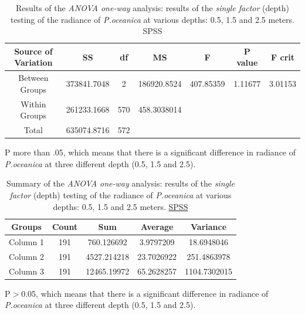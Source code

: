 \documentclass[11pt]{article}
\begin{document}
\begin{appendices}
\begin{table}[htbp]
	\caption{Results of the \textit{ANOVA one-way} analysis: results of the \textit{single factor} (depth) testing of the radiance of \textit{P.oceanica} at various depths: 0.5, 1.5 and 2.5 meters. \ac{SPSS}}\label{tab:8}
	\begin{center}
	\begin{tabular}{|c|c|c|c|c|c|c|}
		\hline\hline
		\textbf{Source of Variation} & \textbf{SS} & \textbf{df} & \textbf{MS} & \textbf{F} & \textbf{P value} & \textbf{F crit} \\ \hline
		Between Groups & 373841.7048 & 2 & 186920.8524 & 407.85359 & 1.11677 & 3.01153 \\ \hline
		Within Groups & 261233.1668 & 570 & 458.3038014 & & & \\ \hline
		Total &  635074.8716 & 572 & & & & \\ \hline
	\end{tabular}
	\end{center} 
	P more than .05, which means that there is a significant difference in radiance of \textit{P.oceanica} at three different depth (0.5, 1.5 and 2.5). 
	
\end{table}

\begin{table}[htbp]
	\caption{Summary of the \textit{ANOVA one-way} analysis: results of the \textit{single factor} (depth) testing of the radiance of \textit{P.oceanica} at various depths: 0.5, 1.5 and 2.5 meters. \href{http://www.spss.com/}{SPSS}}\label{tab:A.7}
	\begin{center}
	\begin{tabular}{|c|c|c|c|c|}
		\hline\hline
		\textbf{Groups} & \textbf{Count} & \textbf{Sum} & \textbf{Average} & \textbf{Variance} \\ \hline\hline
		Column 1 & 191 &	760.126692 & 3.9797209 & 18.6948046 \\ \hline
		Column 2 & 191 &	4527.214218 & 23.7026922  & 251.4863978 \\ \hline
		Column 3 & 191 &	12465.19972 & 65.2628257 & 1104.7302015 \\ \hline
	\end{tabular}
	\end{center}
	P$>$0.05, which means that there is a significant difference in radiance of \textit{P.oceanica} at three different depth (0.5, 1.5 and 2.5). 
 	
\end{table}
\pagebreak


\end{appendices}
\end{document}
